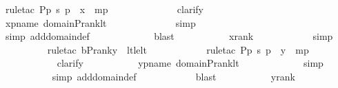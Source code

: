 \begin{isabellebody}
\ {\isacharparenleft}{\kern0pt}rule{\isacharunderscore}{\kern0pt}tac\ P{\isacharequal}{\kern0pt}{\isachardoublequoteopen}{\isasymexists}p{\isachardot}{\kern0pt}\ {\isacharless}{\kern0pt}s{\isacharcomma}{\kern0pt}\ p{\isachargreater}{\kern0pt}\ {\isasymin}\ x{\isachardoublequoteclose}\ \ mp{\isacharparenright}{\kern0pt}\ \isanewline
\ \ \ \ \ \ \ \ \ \ \ \isamarkupfalse%
\ clarify\ \isanewline
\ \ \ \ \ \ \ \ \isamarkupfalse%
\ xpname\ domain{\isacharunderscore}{\kern0pt}P{\isacharunderscore}{\kern0pt}rank{\isacharunderscore}{\kern0pt}lt\ \isanewline
\ \ \ \ \ \ \ \ \ \ \ \isamarkupfalse%
\ simp\ \isanewline
\ \ \ \ \ \ \ \ \ \ \isamarkupfalse%
\ {\isacharparenleft}{\kern0pt}simp\ add{\isacharcolon}{\kern0pt}domain{\isacharunderscore}{\kern0pt}def{\isacharparenright}{\kern0pt}\ \isanewline
\ \ \ \ \ \ \ \ \ \ \isamarkupfalse%
\ blast\ \isanewline
\ \ \ \ \ \ \ \ \isamarkupfalse%
\ xrank\ \isanewline
\ \ \ \ \ \ \ \ \ \isamarkupfalse%
\ simp\ \isanewline
\ \ \ \ \ \ \ \ \isamarkupfalse%
\ {\isacharparenleft}{\kern0pt}rule{\isacharunderscore}{\kern0pt}tac\ b{\isacharequal}{\kern0pt}{\isachardoublequoteopen}P{\isacharunderscore}{\kern0pt}rank{\isacharparenleft}{\kern0pt}y{\isacharparenright}{\kern0pt}{\isachardoublequoteclose}\ \ lt{\isacharunderscore}{\kern0pt}le{\isacharunderscore}{\kern0pt}lt{\isacharparenright}{\kern0pt}\ \isanewline
\ \ \ \ \ \ \ \ \ \isamarkupfalse%
\ {\isacharparenleft}{\kern0pt}rule{\isacharunderscore}{\kern0pt}tac\ P{\isacharequal}{\kern0pt}{\isachardoublequoteopen}{\isasymexists}p{\isachardot}{\kern0pt}\ {\isacharless}{\kern0pt}s{\isacharcomma}{\kern0pt}\ p{\isachargreater}{\kern0pt}\ {\isasymin}\ y{\isachardoublequoteclose}\ \ mp{\isacharparenright}{\kern0pt}\ \isanewline
\ \ \ \ \ \ \ \ \ \ \isamarkupfalse%
\ clarify\ \isanewline
\ \ \ \ \ \ \ \ \isamarkupfalse%
\ ypname\ domain{\isacharunderscore}{\kern0pt}P{\isacharunderscore}{\kern0pt}rank{\isacharunderscore}{\kern0pt}lt\ \isanewline
\ \ \ \ \ \ \ \ \ \ \isamarkupfalse%
\ simp\ \isanewline
\ \ \ \ \ \ \ \ \ \isamarkupfalse%
\ {\isacharparenleft}{\kern0pt}simp\ add{\isacharcolon}{\kern0pt}domain{\isacharunderscore}{\kern0pt}def{\isacharparenright}{\kern0pt}\ \isanewline
\ \ \ \ \ \ \ \ \ \isamarkupfalse%
\ blast\ \isanewline
\ \ \ \ \ \ \ \ \isamarkupfalse%
\ yrank\ \isanewline

\end{isabellebody}

